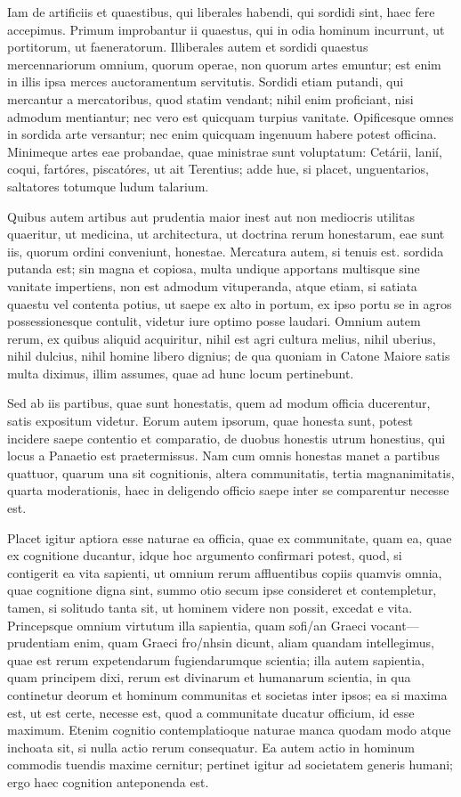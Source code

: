  Iam de artificiis et quaestibus, qui liberales habendi, qui sordidi sint, haec fere accepimus. Primum improbantur ii quaestus, qui in odia hominum incurrunt, ut portitorum, ut faeneratorum. Illiberales autem et sordidi quaestus mercennariorum omnium, quorum operae, non quorum artes emuntur; est enim in illis ipsa merces auctoramentum servitutis. Sordidi etiam putandi, qui mercantur a mercatoribus, quod statim vendant; nihil enim proficiant, nisi admodum mentiantur; nec vero est quicquam turpius vanitate. Opificesque omnes in sordida arte versantur; nec enim quicquam ingenuum habere potest officina. Minimeque artes eae probandae, quae ministrae sunt voluptatum: Cetárii, lanií, coqui, fartóres, piscatóres, ut ait Terentius; adde hue, si placet, unguentarios, saltatores totumque ludum talarium.

 Quibus autem artibus aut prudentia maior inest aut non mediocris utilitas quaeritur, ut medicina, ut architectura, ut doctrina rerum honestarum, eae sunt iis, quorum ordini conveniunt, honestae. Mercatura autem, si tenuis est. sordida putanda est; sin magna et copiosa, multa undique apportans multisque sine vanitate impertiens, non est admodum vituperanda, atque etiam, si satiata quaestu vel contenta potius, ut saepe ex alto in portum, ex ipso portu se in agros possessionesque contulit, videtur iure optimo posse laudari. Omnium autem rerum, ex quibus aliquid acquiritur, nihil est agri cultura melius, nihil uberius, nihil dulcius, nihil homine libero dignius; de qua quoniam in Catone Maiore satis multa diximus, illim assumes, quae ad hunc locum pertinebunt.

 Sed ab iis partibus, quae sunt honestatis, quem ad modum officia ducerentur, satis expositum videtur. Eorum autem ipsorum, quae honesta sunt, potest incidere saepe contentio et comparatio, de duobus honestis utrum honestius, qui locus a Panaetio est praetermissus. Nam cum omnis honestas manet a partibus quattuor, quarum una sit cognitionis, altera communitatis, tertia magnanimitatis, quarta moderationis, haec in deligendo officio saepe inter se comparentur necesse est.

 Placet igitur aptiora esse naturae ea officia, quae ex communitate, quam ea, quae ex cognitione ducantur, idque hoc argumento confirmari potest, quod, si contigerit ea vita sapienti, ut omnium rerum affluentibus copiis quamvis omnia, quae cognitione digna sint, summo otio secum ipse consideret et contempletur, tamen, si solitudo tanta sit, ut hominem videre non possit, excedat e vita. Princepsque omnium virtutum illa sapientia, quam sofi/an Graeci vocant—prudentiam enim, quam Graeci fro/nhsin dicunt, aliam quandam intellegimus, quae est rerum expetendarum fugiendarumque scientia; illa autem sapientia, quam principem dixi, rerum est divinarum et humanarum scientia, in qua continetur deorum et hominum communitas et societas inter ipsos; ea si maxima est, ut est certe, necesse est, quod a communitate ducatur officium, id esse maximum. Etenim cognitio contemplatioque naturae manca quodam modo atque inchoata sit, si nulla actio rerum consequatur. Ea autem actio in hominum commodis tuendis maxime cernitur; pertinet igitur ad societatem generis humani; ergo haec cognition anteponenda est.

